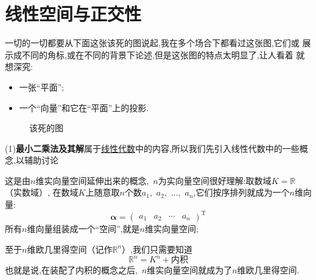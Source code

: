 \documentclass[cn,10pt,citestyle=gb7714-2015,bibstyle=gb7714-2015]{elegantbook}
\renewcommand{\emph}[1]{\textbf{#1}}%
\begin{document}
\section{线性空间与正交性}\label{sec:orthogonality}
一切的一切都要从下面这张该死的图说起,我在多个场合下都看过这张图,它们或
展示成不同的角标,或在不同的背景下论述,但是这张图的特点太明显了,让人看着
就想深究:
\begin{itemize}
    \item[\textcolor{magenta}{\HandRight}] 一张“平面”;
    \item[\textcolor{magenta}{\HandRight}] 一个“向量”和它在“平面”上的投影.
\end{itemize}
\begin{figure}[H]
    \centering
    \caption{该死的图}
\end{figure}
(1)\emph{最小二乘法及其解}属于\uline{线性代数}中的内容,所以我们先引入线性代数中的一些概念,以辅助讨论
\begin{definition}[$n$维欧几里得空间]
  这是由$n$维实向量空间延伸出来的概念,\ $n$为实向量空间很好理解:取数域$K=\mathbb{R}$（实数域）,
  在数域$K$上随意取$n$个数$a_1$,\ $a_2$,\ $\ldots$,\ $a_n$,它们按序排列就成为一个$n$维向量:
  \[
      \bm{\alpha}=\begin{pmatrix}
          a_1&a_2&\cdots&a_n
      \end{pmatrix}^\mathrm{T}
  \]
  所有$n$维向量组装成一个“空间”,就是$n$维实向量空间;

  至于$n$维欧几里得空间（记作$\mathbb{R}^n$）,我们只需要知道
  \[
      \mathbb{R}^n=K^n+\text{内积}
  \]
  也就是说,在装配了内积的概念之后,\ $n$维实向量空间就成为了$n$维欧几里得空间.
\end{definition}
\end{document}

